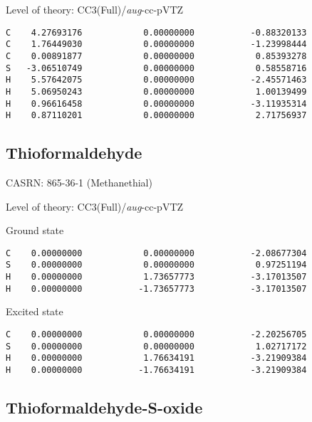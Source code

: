 \documentclass[journal=jctcce,manuscript=article,layout=traditional]{achemso}
\newcommand{\AVTZ}{\emph{aug}-cc-pVTZ}
\begin{document}
\begin{singlespace}
\noindent Level of theory: CC3(Full)/{\AVTZ}
\begin{verbatim}
C    4.27693176            0.00000000           -0.88320133
C    1.76449030            0.00000000           -1.23998444
C    0.00891877            0.00000000            0.85393278
S   -3.06510749            0.00000000            0.58558716
H    5.57642075            0.00000000           -2.45571463
H    5.06950243            0.00000000            1.00139499
H    0.96616458            0.00000000           -3.11935314
H    0.87110201            0.00000000            2.71756937
\end{verbatim}
\end{singlespace}

\subsection{Thioformaldehyde}

CASRN:  865-36-1 (Methanethial)

\begin{singlespace}
\noindent Level of theory: CC3(Full)/{\AVTZ}
\end{singlespace}

\begin{singlespace}
\noindent Ground state
\begin{verbatim}
C    0.00000000            0.00000000           -2.08677304
S    0.00000000            0.00000000            0.97251194
H    0.00000000            1.73657773           -3.17013507
H    0.00000000           -1.73657773           -3.17013507
\end{verbatim}
\end{singlespace}

\begin{singlespace}
\noindent Excited state
\begin{verbatim}
C    0.00000000            0.00000000           -2.20256705
S    0.00000000            0.00000000            1.02717172
H    0.00000000            1.76634191           -3.21909384
H    0.00000000           -1.76634191           -3.21909384
\end{verbatim}
\end{singlespace}

\subsection{Thioformaldehyde-S-oxide}
\end{document}
